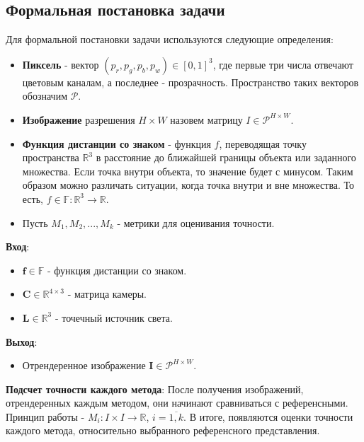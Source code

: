\documentclass[a4paper,hidelinks,12pt]{article}
\begin{document}
\newpage

\subsection{Формальная постановка задачи}

Для формальной постановки задачи используются следующие определения:

\begin{itemize}[leftmargin=4em]
	\item \textbf{Пиксель} - вектор $(p_r, p_g, p_b, p_w) \in [0, 1]^3$, где первые три числа отвечают цветовым каналам, а последнее - прозрачность. Пространство таких векторов
	обозначим $\mathcal{P}$.
	\item \textbf{Изображение} разрешения $H \times W$ назовем матрицу $I \in \mathcal{P}^{H \times W}$.
	\item \textbf{Функция дистанции со знаком} - функция $f$, переводящая точку пространства $\mathbb{R}^{3}$ в расстояние до ближайшей границы объекта или заданного множества. Если точка внутри объекта, то значение будет с минусом. Таким образом можно различать ситуации, когда точка внутри и вне множества.
	\newline То есть, $f \in \mathbb{F} : \mathbb{R}^{3} \to \mathbb{R}$.
	\item Пусть $M_1, M_2, ..., M_k$ - метрики для оценивания точности.
\end{itemize}

\textbf{Вход}:
\par
\begin{itemize}[leftmargin=4em]
	\item $\textbf{f} \in \mathbb{F}$ - функция дистанции со знаком.
	\item $\textbf{C} \in \mathbb{R}^{4 \times 3}$ - матрица камеры.
	\item $\textbf{L} \in \mathbb{R}^{3}$ - точечный источник света.
\end{itemize}

\textbf{Выход}:
\par
\begin{itemize}[leftmargin=4em]
	\item Отрендеренное изображение $\textbf{I} \in \mathcal{P}^{H \times W}$.
\end{itemize}

\textbf{Подсчет точности каждого метода}: \newline После получения изображений, отрендеренных каждым методом, они начинают сравниваться с референсными. Принцип работы - $M_i : I \times I \to \mathbb{R}$, $i = \overline{1,k}$. В итоге, появляются оценки точности каждого метода, относительно выбранного референсного представления.
\end{document}
